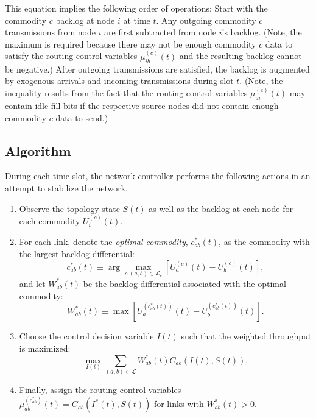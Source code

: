 \documentclass{article}
\newenvironment{myenumerate}{
	\begin{enumerate}
	\setlength{\itemsep}{1pt}
	\setlength{\parskip}{0pt}
	\setlength{\parsep}{0pt}}{\end{enumerate}
	}
\begin{document}
This equation implies the following order of operations: Start with the commodity \(c\) backlog at node \(i\) at time \(t\).
Any outgoing commodity \(c\) transmissions from node \(i\) are first subtracted from node \(i\)'s backlog.
(Note, the maximum is required because there may not be enough commodity \(c\) data to satisfy the routing control variables \(\mu_{ib}^{(c)}(t)\) and the resulting backlog cannot be negative.)
After outgoing transmissions are satisfied, the backlog is augmented by exogenous arrivals and incoming transmissions during slot \(t\).
(Note, the inequality results from the fact that the routing control variables \(\mu_{ai}^{(c)}(t)\) may contain idle fill bits if the respective source nodes did not contain enough commodity \(c\) data to send.)


\subsection{Algorithm}\label{sec:theory-algorithm}

During each time-slot, the network controller performs the following actions in an attempt to stabilize the network.

\begin{myenumerate}
\item Observe the topology state \(S(t)\) as well as the backlog at each node for each commodity \(U_{i}^{(c)}(t)\).


\item For each link, denote the \emph{optimal commodity}, \(c_{ab}^{*}(t)\), as the commodity with the largest backlog differential:
%
\begin{equation}
\label{eq:opt-commodity}
c_{ab}^{*}(t) \equiv \arg\max_{c|(a,b)\in \mathcal{L}_c}\left[U_{a}^{(c)}(t) - U_{b}^{(c)}(t)\right],
\end{equation}
%
and let \(W_{ab}^{*}(t)\) be the backlog differential associated with the optimal commodity:
%
\begin{equation}
\label{eq:opt-weight}
W_{ab}^{*}(t) \equiv \max\left[ U_{a}^{(c_{ab}^{*}(t))}(t) - U_{b}^{(c_{ab}^{*}(t))}(t) \right].
\end{equation}


\item Choose the control decision variable \(I(t)\) such that the weighted throughput is maximized:
%
\begin{equation}
\label{eq:bp-opt-problem}
\max_{I(t)} \sum_{(a,b)\in\mathcal{L}} W_{ab}^{*}(t)C_{ab}(I(t),S(t)).
\end{equation}


\item Finally, assign the routing control variables \(\mu_{ab}^{(c_{ab}^{*})}(t) = C_{ab}(I^{*}(t),S(t))\) for links with \(W_{ab}^{*}(t) > 0\).
\end{myenumerate}
\end{document}
